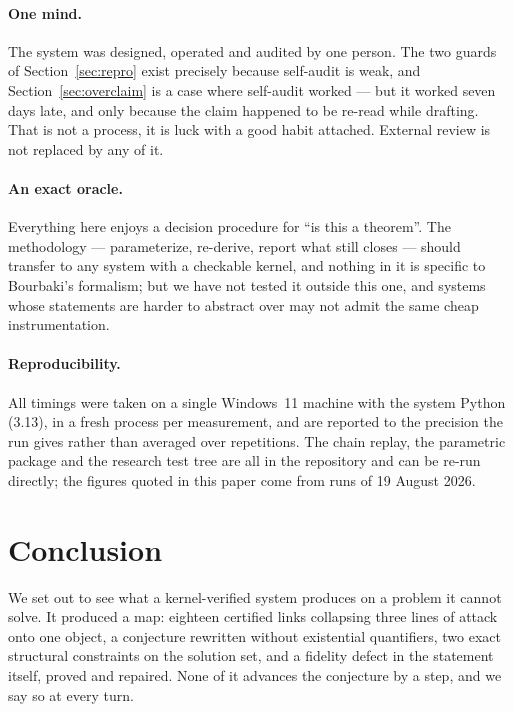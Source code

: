 \documentclass[11pt]{article}
\theoremstyle{remark}\newtheorem{remark}{Remark}
\begin{document}
\paragraph{One mind.} The system was designed, operated and audited by one person. The
two guards of Section~\ref{sec:repro} exist precisely because self-audit is weak, and
Section~\ref{sec:overclaim} is a case where self-audit worked --- but it worked seven
days late, and only because the claim happened to be re-read while drafting. That is not
a process, it is luck with a good habit attached. External review is not replaced by any
of it.

\paragraph{An exact oracle.} Everything here enjoys a decision procedure for ``is this a
theorem''. The methodology --- parameterize, re-derive, report what still closes ---
should transfer to any system with a checkable kernel, and nothing in it is specific to
Bourbaki's formalism; but we have not tested it outside this one, and systems whose
statements are harder to abstract over may not admit the same cheap instrumentation.

\paragraph{Reproducibility.} All timings were taken on a single Windows~11 machine with
the system Python (3.13), in a fresh process per measurement, and are reported to the
precision the run gives rather than averaged over repetitions. The chain replay, the
parametric package and the research test tree are all in the repository and can be
re-run directly; the figures quoted in this paper come from runs of 19 August 2026.

\section{Conclusion}

We set out to see what a kernel-verified system produces on a problem it cannot solve.
It produced a map: eighteen certified links collapsing three lines of attack onto one
object, a conjecture rewritten without existential quantifiers, two exact structural
constraints on the solution set, and a fidelity defect in the statement itself, proved
and repaired. None of it advances the conjecture by a step, and we say so at every
turn.
\end{document}
